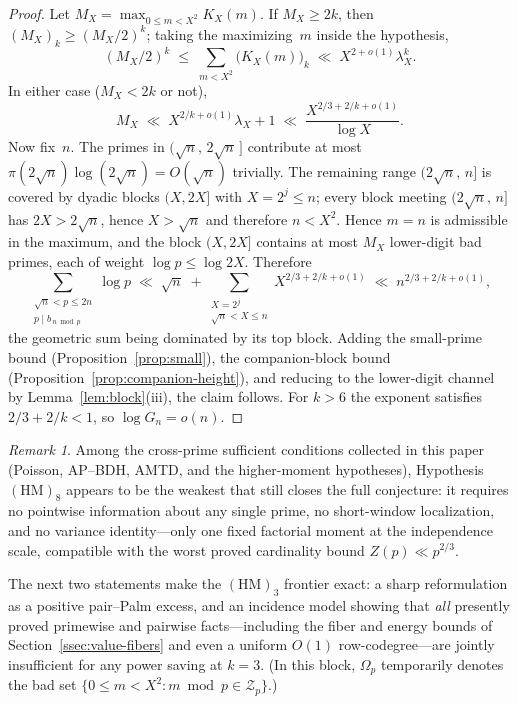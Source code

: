 \documentclass[11pt]{article}
\theoremstyle{definition}
\theoremstyle{remark}
\newtheorem{remark}[theorem]{Remark}
\begin{document}
\begin{proof}
Let $M_X = \max_{0 \le m < X^2} K_X(m)$.
If $M_X \ge 2k$, then $(M_X)_k \ge (M_X/2)^k$; taking the
maximizing~$m$ inside the hypothesis,
\[
  (M_X/2)^k
  \;\le\; \sum_{m<X^2}\bigl(K_X(m)\bigr)_k
  \;\ll\; X^{2+o(1)}\lambda_X^k .
\]
In either case ($M_X < 2k$ or not),
\[
  M_X \;\ll\; X^{2/k + o(1)} \lambda_X + 1
  \;\ll\; \frac{X^{2/3 + 2/k + o(1)}}{\log X}.
\]
Now fix~$n$. The primes in $(\sqrt n,\, 2\sqrt n\,]$
contribute at most
$\pi(2\sqrt n)\log(2\sqrt n) = O(\sqrt n)$ trivially.
The remaining range $(2\sqrt n,\, n]$ is covered by dyadic
blocks $(X, 2X]$ with $X = 2^j \le n$; every block meeting
$(2\sqrt n,\, n]$ has $2X > 2\sqrt n$, hence $X > \sqrt n$
and therefore $n < X^2$.
Hence $m = n$ is admissible in the maximum, and the block
$(X, 2X]$ contains at most $M_X$ lower-digit bad primes,
each of weight $\log p \le \log 2X$. Therefore
\[
  \sum_{\substack{\sqrt n < p \le 2n \\ p \mid b_{\,n \bmod p}}}
  \log p
  \;\ll\; \sqrt{n} \;+ \sum_{\substack{X = 2^j \\ \sqrt n < X \le n}}
    X^{2/3 + 2/k + o(1)}
  \;\ll\; n^{2/3 + 2/k + o(1)},
\]
the geometric sum being dominated by its top block.
Adding the small-prime bound
(Proposition~\ref{prop:small}), the companion-block bound
(Proposition~\ref{prop:companion-height}), and reducing to
the lower-digit channel by Lemma~\ref{lem:block}(iii),
the claim follows.
For $k > 6$ the exponent satisfies $2/3 + 2/k < 1$,
so $\log G_n = o(n)$.
\end{proof}

\begin{remark}
Among the cross-prime sufficient conditions collected in this paper
(Poisson, AP--BDH, AMTD, and the higher-moment hypotheses),
Hypothesis~$(\mathrm{HM})_8$ appears to be the weakest that
still closes the full conjecture: it requires no pointwise
information about any single prime, no short-window
localization, and no variance identity---only one fixed
factorial moment at the independence scale, compatible with
the worst proved cardinality bound $Z(p) \ll p^{2/3}$.
\end{remark}

The next two statements make the $(\mathrm{HM})_3$
frontier exact: a sharp reformulation as a positive
pair--Palm excess, and an incidence model showing that
\emph{all} presently proved primewise and pairwise
facts---including the fiber and energy bounds of
Section~\ref{ssec:value-fibers} and even a uniform
$O(1)$ row-codegree---are jointly insufficient for any
power saving at $k = 3$.
(In this block, $\Omega_p$ temporarily denotes the bad
set $\{0 \le m < X^2 : m \bmod p \in \mathcal Z_p\}$.)
\end{document}
